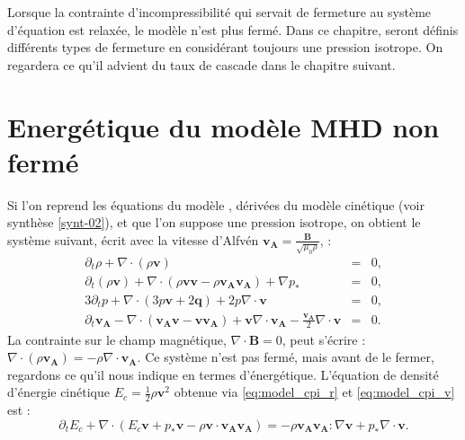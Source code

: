 Lorsque la contrainte d'incompressibilité qui servait de fermeture au système d'équation est relaxée, le modèle n'est plus fermé. Dans ce chapitre, seront définis différents types de fermeture en considérant toujours une pression isotrope. On regardera ce qu'il advient du taux de cascade dans le chapitre suivant.   

\section{Energétique du modèle MHD non fermé}
\label{sec-121}
Si l'on reprend les équations du modèle , dérivées du modèle cinétique (voir synthèse \ref{synt-02}), et que l'on suppose une pression isotrope, on obtient le système suivant, écrit avec la vitesse d'Alfvén $\boldsymbol{v_A}=\frac{\boldsymbol{B}}{\sqrt{\mu_0\rho}}$, : 
\begin{eqnarray}
\partial_t \rho + \nabla \cdot \left(\rho \boldsymbol{v}\right) &=& 0 \label{eq:model_cpi_r}, \\
\partial_t \left(\rho \boldsymbol{v}\right) + \nabla \cdot \left(\rho \boldsymbol{v}\boldsymbol{v} - \rho \boldsymbol{v_A}\boldsymbol{v_A}\right) +  \nabla p_*  &=& 0 \label{eq:model_cpi_v}, \\
3 \partial_t p + \nabla \cdot \left( 3 p\boldsymbol{v} + 2\boldsymbol{q}\right) + 2 p \nabla \cdot \boldsymbol{v} & =& 0 \label{eq:model_cpi_p}, \\
\partial_t \boldsymbol{v_A} -  \nabla \cdot \left(\boldsymbol{v_A}\boldsymbol{v} - \boldsymbol{v}\boldsymbol{v_A}\right) +  \boldsymbol{v}  \nabla \cdot \boldsymbol{v_A} -  \frac{\boldsymbol{v_A}}{2}  \nabla \cdot \boldsymbol{v} &=& 0 .\label{eq:model_cpi_b}
\end{eqnarray}
La contrainte sur le champ magnétique, $\nabla \cdot \boldsymbol{B}=0$, peut s'écrire : $\nabla \cdot \left(\rho \boldsymbol{v_A}\right) = - \rho \nabla \cdot \boldsymbol{v_A} $.
Ce système n'est pas fermé, mais avant de le fermer, regardons ce qu'il nous indique en termes d'énergétique.  
L'équation de densité d'énergie cinétique $E_c = \frac{1}{2}\rho \boldsymbol{v}^2$ obtenue via \eqref{eq:model_cpi_r} et \eqref{eq:model_cpi_v} est :
\begin{equation}
 \label{eq:model_cpi_k}   \partial_t E_c +\nabla \cdot \left(E_c \boldsymbol{v} + p_* \boldsymbol{v}- \rho \boldsymbol{v} \cdot \boldsymbol{v_A}\boldsymbol{v_A}\right)   = -  \rho \boldsymbol{v_A}  \boldsymbol{v_A} : \nabla \boldsymbol{v} + p_* \nabla \cdot \boldsymbol{v}.
\end{equation}
